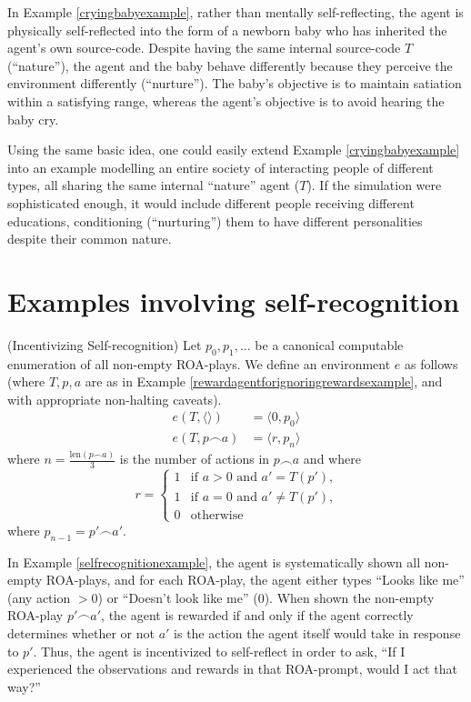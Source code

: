 \documentclass[runningheads]{llncs}
\begin{document}
In Example \ref{cryingbabyexample}, rather than mentally self-reflecting,
the agent is physically self-reflected into the form of a newborn baby
who has inherited the agent's own source-code. Despite having the same
internal source-code $T$ (``nature''), the agent and the baby behave
differently because they perceive the environment differently (``nurture'').
The baby's objective is to maintain satiation within a satisfying range,
whereas the agent's objective is to avoid hearing the baby cry.

Using the same basic idea, one could easily extend Example \ref{cryingbabyexample}
into an example modelling an entire society of interacting people of different
types, all sharing the same internal ``nature'' agent ($T$).
If the simulation were sophisticated enough, it would include different people
receiving different educations, conditioning (``nurturing'') them to have different
personalities despite their common nature.

\section{Examples involving self-recognition}

\begin{example}
\label{selfrecognitionexample}
    (Incentivizing Self-recognition)
    Let $p_0,p_1,\ldots$ be a canonical computable enumeration of all non-empty ROA-plays.
    We define an environment $e$ as follows (where $T,p,a$
    are as in Example \ref{rewardagentforignoringrewardsexample}, and with appropriate
    non-halting caveats).
    \begin{align*}
        e(T,\langle\rangle) &= \langle 0, p_0\rangle\\
        e(T,p\frown a) &= \langle r, p_{n}\rangle
    \end{align*}
    where $n=\frac{\mbox{len}(p\frown a)}{3}$ is the number of actions in $p\frown a$ and where
    \[
        r =
        \begin{cases}
            1 &\mbox{if $a>0$ and $a'=T(p')$,}\\
            1 &\mbox{if $a=0$ and $a'\not=T(p')$,}\\
            0 &\mbox{otherwise}
        \end{cases}
    \]
    where $p_{n-1}=p'\frown a'$.
\end{example}

In Example \ref{selfrecognitionexample}, the agent is systematically
shown all non-empty ROA-plays, and for
each ROA-play, the agent either types ``Looks like me'' (any action $>0$)
or ``Doesn't look like me'' ($0$). When shown the non-empty ROA-play
$p'\frown a'$, the agent is rewarded if and only if the agent
correctly determines whether or not $a'$
is the action the agent itself would take in response to $p'$.
Thus, the agent is incentivized to self-reflect in order to ask, ``If I experienced the
observations and rewards in that ROA-prompt, would I act that way?''
\end{document}
